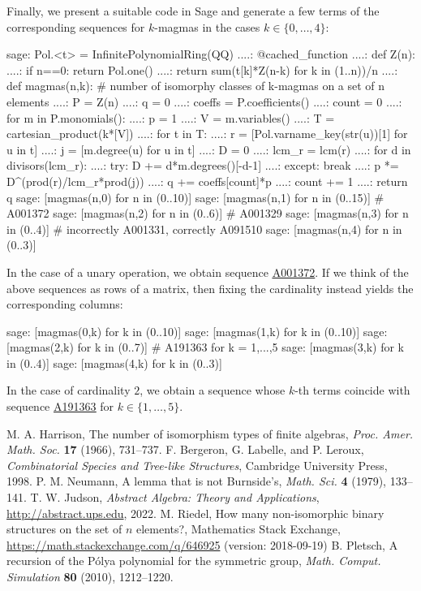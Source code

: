 \documentclass[12pt]{article}
\newcommand{\seqnum}[1]{\href{https://oeis.org/#1}{\rm \underline{#1}}}
\theoremstyle{definition}
\theoremstyle{remark}
\begin{document}
	Finally, we present a suitable code in Sage and generate a few terms of the corresponding sequences for $k$-magmas in the cases $k \in \{0,\dots,4\}$:
	\begin{sageexample}
	sage: Pol.<t> = InfinitePolynomialRing(QQ)
	....: @cached_function
	....: def Z(n):
	....:     if n==0: return Pol.one()
	....:     return sum(t[k]*Z(n-k) for k in (1..n))/n
	....: def magmas(n,k): # number of isomorphy classes of k-magmas on a set of n elements
	....:     P = Z(n)
	....:     q = 0
	....:     coeffs = P.coefficients()
	....:     count = 0
	....:     for m in P.monomials():
	....:         p = 1
	....:         V = m.variables()
	....:         T = cartesian_product(k*[V])
	....:         for t in T:
	....:             r = [Pol.varname_key(str(u))[1] for u in t]
	....:             j = [m.degree(u) for u in t]
	....:             D = 0
	....:             lcm_r = lcm(r)
	....:             for d in divisors(lcm_r):
	....:                 try: D += d*m.degrees()[-d-1]    
	....:                 except: break
	....:             p *= D^(prod(r)/lcm_r*prod(j))
	....:         q += coeffs[count]*p
	....:         count += 1
	....:     return q
	sage: [magmas(n,0) for n in (0..10)]
	sage: [magmas(n,1) for n in (0..15)]   # A001372
	sage: [magmas(n,2) for n in (0..6)]    # A001329
	sage: [magmas(n,3) for n in (0..4)]    # incorrectly A001331, correctly A091510
	sage: [magmas(n,4) for n in (0..3)]
	\end{sageexample}
	In the case of a unary operation, we obtain sequence \seqnum{A001372}. If we think of the above sequences as rows of a matrix, then fixing the cardinality instead yields the corresponding columns:
	\begin{sageexample}
	sage: [magmas(0,k) for k in (0..10)]
	sage: [magmas(1,k) for k in (0..10)]
	sage: [magmas(2,k) for k in (0..7)]    # A191363 for k = 1,...,5
	sage: [magmas(3,k) for k in (0..4)]
	sage: [magmas(4,k) for k in (0..3)]
	\end{sageexample}
	In the case of cardinality $2$, we obtain a sequence whose $k$-th terms coincide with sequence \seqnum{A191363} for $k\in \{1,\dots,5\}$.
	
	\begin{thebibliography}{9}
		 M. A. Harrison, The number of isomorphism types of finite algebras, {\it Proc. Amer. Math. Soc.} {\bf 17} (1966), 731--737.
		 F. Bergeron, G. Labelle, and P. Leroux, {\it Combinatorial Species and Tree-like Structures}, Cambridge University Press, 1998.
		 P. M. Neumann, A lemma that is not Burnside's, {\it Math. Sci.} {\bf 4} (1979), 133--141.
		 T. W. Judson, {\it Abstract Algebra: Theory and Applications}, \url{http://abstract.ups.edu}, 2022.
		 M. Riedel, How many non-isomorphic binary structures on the set of $n$ elements?, Mathematics Stack Exchange, \url{https://math.stackexchange.com/q/646925} (version: 2018-09-19)
		 B. Pletsch, A recursion of the P\'olya polynomial for the symmetric group, {\it Math. Comput. Simulation} {\bf 80} (2010), 1212--1220.
	\end{thebibliography}
\end{document}
